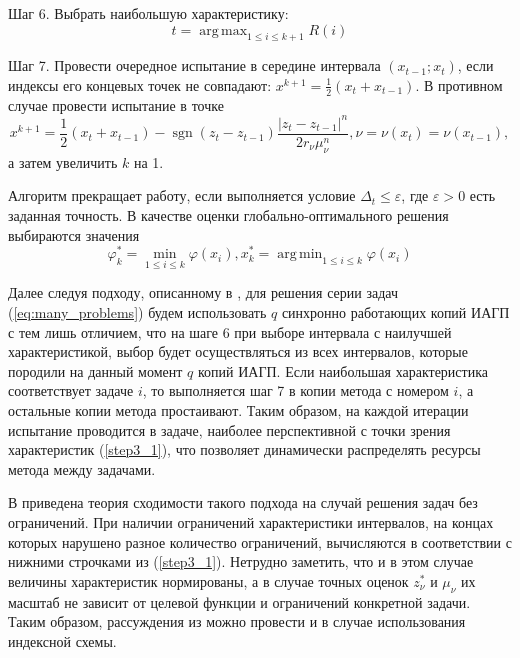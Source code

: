 \documentclass[11pt, oneside, a4paper]{article}
\DeclareMathOperator*{\argmax}{arg\,max}
\DeclareMathOperator*{\argmin}{arg\,min}
\begin{document}
Шаг 6. Выбрать наибольшую характеристику:
\begin{equation}
\label{step4}
t=\argmax_{1\leqslant i \leqslant k+1}R(i)
\end{equation}

Шаг 7. Провести очередное испытание в середине интервала \((x_{t-1};x_{t})\),
если индексы его концевых точек не совпадают: \(x^{k+1}={\frac {1}{2}}(x_{t}+x_{t-1})\).
В противном случае провести испытание в точке
\begin{displaymath}
  x^{k+1}={\frac {1}{2}}(x_{t}+x_{t-1})-\operatorname {sgn}(z_{t}-z_{t-1}){\frac {|z_{t}-z_{t-1}|^{n}}{2r_{\nu }\mu _{\nu }^{n}}},\nu =\nu (x_{t})=\nu (x_{t-1}),
\end{displaymath}
а затем увеличить \(k\) на 1.

Алгоритм прекращает работу, если выполняется условие \(\Delta_{t}\leqslant \varepsilon\),
где \(\varepsilon>0\) есть заданная точность. В качестве оценки глобально-оптимального решения выбираются значения
\begin{equation}
\varphi_k^*=\min_{1\leqslant i \leqslant k}\varphi(x_i), x_k^*=\argmin_{1\leqslant i \leqslant k}\varphi(x_i)
\end{equation}

Далее следуя подходу, описанному в \cite{BarkalovStrongin2018}, для решения серии задач (\ref{eq:many_problems}) будем
использовать \(q\) синхронно работающих копий ИАГП с тем лишь отличием, что на шаге 6 при выборе
интервала с наилучшей характеристикой, выбор будет осуществляться из всех интервалов, которые
породили на данный момент \(q\) копий ИАГП. Если наибольшая характеристика соответствует
задаче \(i\), то выполняется шаг 7 в копии метода с номером \(i\), а остальные копии метода простаивают.
Таким образом, на каждой итерации испытание проводится в задаче, наиболее перспективной с точки зрения
характеристик (\ref{step3_1}), что позволяет динамически распределять ресурсы метода между задачами.

В \cite{BarkalovStrongin2018} приведена теория сходимости такого подхода на случай решения задач без ограничений.
При наличии ограничений характеристики интервалов, на концах которых нарушено разное количество ограничений,
вычисляются в соответствии с нижними строчками из (\ref{step3_1}). Нетрудно заметить, что и в этом случае
величины характеристик нормированы, а в случае точных оценок \(z_{\nu }^{*}\) и \(\mu _{\nu }\) их
масштаб не зависит от целевой функции и ограничений конкретной задачи. Таким образом, рассуждения
из \cite{BarkalovStrongin2018} можно провести и в случае использования индексной схемы.
\end{document}
